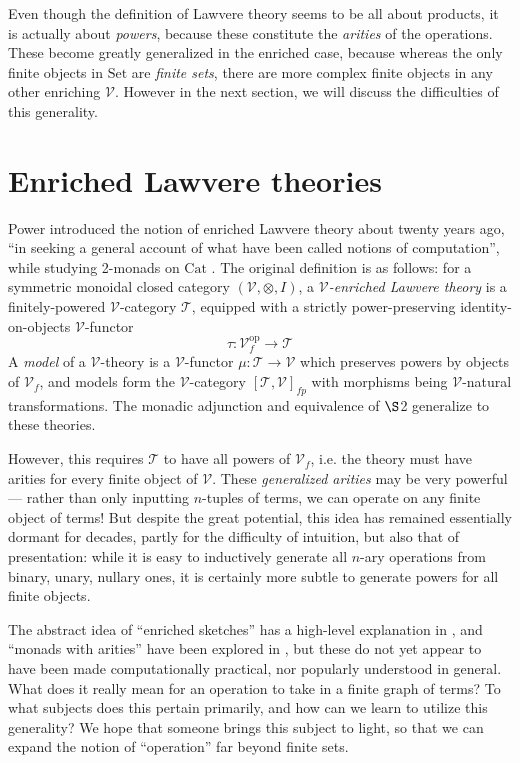 \documentclass{amsart}
\theoremstyle{definition}
\newcommand{\Set}{\mathrm{Set}}
\newcommand{\Cat}{\mathrm{Cat}}
\newcommand{\op}{\mathrm{op}}
\newcommand{\V}{\mathscr{V}}
\newcommand{\T}{\mathscr{T}}
\newcommand{\maps}{\colon}
\begin{document}
Even though the definition of Lawvere theory seems to be all about products, it is actually about \textit{powers}, because these constitute the \textit{arities} of the operations. These become greatly generalized in the enriched case, because whereas the only finite objects in $\Set$ are \textit{finite sets}, there are more complex finite objects in any other enriching $\V$. However in the next section, we will discuss the difficulties of this generality.

\section{Enriched Lawvere theories}
Power introduced the notion of enriched Lawvere theory about twenty years ago, ``in seeking a general account of what have been called notions of computation'', while studying 2-monads on $\Cat$ \cite{power}. The original definition is as follows: for a symmetric monoidal closed category $(\V,\otimes,I)$, a \textit{$\V$-enriched Lawvere theory} is a finitely-powered $\V$-category $\T$, equipped with a strictly power-preserving identity-on-objects $\V$-functor $$\tau\maps\V_f^\op \to \T$$ A \textit{model} of a $\V$-theory is a $\V$-functor $\mu\maps\T \to \V$ which preserves powers by objects of $\V_f$, and models form the $\V$-category $[\T,\V]_{fp}$ with morphisms being $\V$-natural transformations. The monadic adjunction and equivalence of $\S$2 generalize to these theories.

However, this requires $\T$ to have all powers of $\V_f$, i.e. the theory must have arities for every finite object of $\V$. These \textit{generalized arities} may be very powerful --- rather than only inputting $n$-tuples of terms, we can operate on any finite object of terms! But despite the great potential, this idea has remained essentially dormant for decades, partly for the difficulty of intuition, but also that of presentation: while it is easy to inductively generate all $n$-ary operations from binary, unary, nullary ones, it is certainly more subtle to generate powers for all finite objects.

The abstract idea of ``enriched sketches'' has a high-level explanation in \cite{powsketch}, and ``monads with arities'' have been explored in \cite{mndarty}, but these do not yet appear to have been made computationally practical, nor popularly understood in general. What does it really mean for an operation to take in a finite graph of terms? To what subjects does this pertain primarily, and how can we learn to utilize this generality? We hope that someone brings this subject to light, so that we can expand the notion of ``operation'' far beyond finite sets.\\
\end{document}
